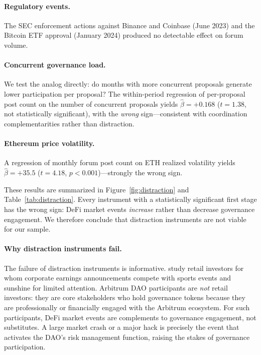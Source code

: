 \documentclass[12pt]{article}
\begin{document}
\paragraph{Regulatory events.}
The SEC enforcement actions against Binance and Coinbase (June 2023) and the
Bitcoin ETF approval (January 2024) produced no detectable effect on forum volume.

\paragraph{Concurrent governance load.}
We test the \citet{hirshleifer2009} analog directly: do months with more concurrent
proposals generate lower participation per proposal? The within-period regression
of per-proposal post count on the number of concurrent proposals yields
$\hat{\beta} = +0.168$ ($t = 1.38$, not statistically significant), with the
\emph{wrong} sign---consistent with coordination complementarities rather than
distraction.

\paragraph{Ethereum price volatility.}
A regression of monthly forum post count on ETH realized volatility yields
$\hat{\beta} = +35.5$ ($t = 4.18$, $p < 0.001$)---strongly the wrong sign.

These results are summarized in Figure~\ref{fig:distraction} and
Table~\ref{tab:distraction}. Every instrument with a statistically significant
first stage has the wrong sign: DeFi market events \emph{increase} rather than
decrease governance engagement. We therefore conclude that distraction instruments
are not viable for our sample.

\paragraph{Why distraction instruments fail.}
The failure of distraction instruments is informative. \citet{hirshleifer2009}
study retail investors for whom corporate earnings announcements compete with
sports events and sunshine for limited attention. Arbitrum DAO participants are
\emph{not} retail investors: they are core stakeholders who hold governance tokens
because they are professionally or financially engaged with the Arbitrum ecosystem.
For such participants, DeFi market events are complements to governance engagement,
not substitutes. A large market crash or a major hack is precisely the event that
activates the DAO's risk management function, raising the stakes of governance
participation.
\end{document}
